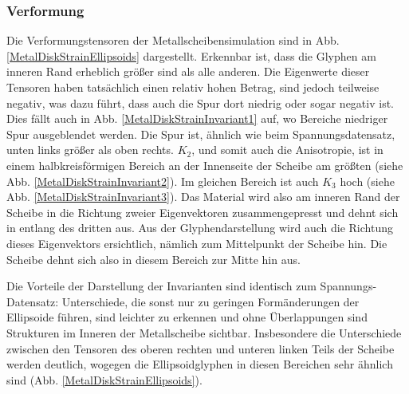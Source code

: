 \documentclass[a4paper,fontsize=12pt,toc=bib,halfparskip]{scrartcl}
\begin{document}
\subsubsection{Verformung}
Die Verformungstensoren der Metallscheibensimulation sind in Abb. \ref{MetalDiskStrainEllipsoids} dargestellt. Erkennbar ist, dass die Glyphen am inneren Rand erheblich gr\"o{\ss}er sind als alle anderen. Die Eigenwerte dieser Tensoren haben tats\"achlich einen relativ hohen Betrag, sind jedoch teilweise negativ, was dazu f\"uhrt, dass auch die Spur dort niedrig oder sogar negativ ist. Dies f\"allt auch in Abb. \ref{MetalDiskStrainInvariant1} auf, wo Bereiche niedriger Spur ausgeblendet werden.
Die Spur ist, \"ahnlich wie beim Spannungsdatensatz, unten links gr\"o{\ss}er als oben rechts. $K_2$, und somit auch die Anisotropie, ist in einem halbkreisf\"ormigen Bereich an der Innenseite der Scheibe am gr\"o{\ss}ten (siehe Abb. \ref{MetalDiskStrainInvariant2}). Im gleichen Bereich ist auch $K_3$ hoch (siehe Abb. \ref{MetalDiskStrainInvariant3}). Das Material wird also am inneren Rand der Scheibe in die Richtung zweier Eigenvektoren zusammengepresst und dehnt sich in entlang des dritten aus. Aus der Glyphendarstellung wird auch die Richtung dieses Eigenvektors ersichtlich, n\"amlich zum Mittelpunkt der Scheibe hin. Die Scheibe dehnt sich also in diesem Bereich zur Mitte hin aus.

Die Vorteile der Darstellung der Invarianten sind identisch zum Spannungs-Datensatz: Unterschiede, die sonst nur zu geringen Form\"anderungen der Ellipsoide f\"uhren, sind leichter zu erkennen und ohne \"Uberlappungen sind Strukturen im Inneren der Metallscheibe sichtbar. Insbesondere die Unterschiede zwischen den Tensoren des oberen rechten und unteren linken Teils der Scheibe werden deutlich, wogegen die Ellipsoidglyphen in diesen Bereichen sehr \"ahnlich sind (Abb. \ref{MetalDiskStrainEllipsoids}).
\end{document}
